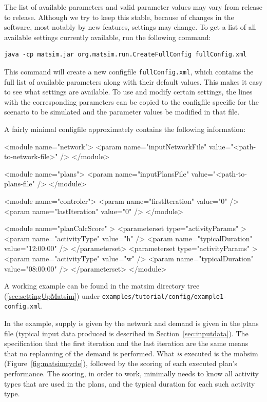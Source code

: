 The list of available parameters and valid parameter values may vary from release to release. Although we try to keep this stable,
because of changes in the software, most notably by new features, settings may change. To get a list of all available settings currently available, run the following command:
\begin{lstlisting}
java -cp matsim.jar org.matsim.run.CreateFullConfig fullConfig.xml
\end{lstlisting}
%
This command will create a new \gls{configfile} \lstinline|fullConfig.xml|, which contains the full list of available parameters along with their default values. This makes it easy to see what settings are available. To use and modify certain settings, the lines with the corresponding parameters can be copied to the \gls{configfile} specific for the \gls{scenario} to be simulated and the parameter values be modified in that file. 

A fairly minimal \gls{configfile} approximately contains the following information:
\begin{xml}
<module name="network">
   <param name="inputNetworkFile" value="<path-to-network-file>" />
</module>

<module name="plans">
   <param name="inputPlansFile" value="<path-to-plans-file" />
</module>

<module name="controler">
   <param name="firstIteration" value="0" />
   <param name="lastIteration" value="0" />
</module>

<module name="planCalcScore" >
   <parameterset type="activityParams" >
      <param name="activityType" value="h" />
      <param name="typicalDuration" value="12:00:00" />
   </parameterset>
   <parameterset type="activityParams" >
      <param name="activityType" value="w" />
      <param name="typicalDuration" value="08:00:00" />
   </parameterset>
</module>
\end{xml}
A working example can be found in the \gls{matsim} directory tree (\cf \ref{sec:settingUpMatsim}) under \lstinline{examples/tutorial/config/example1-config.xml}.
 
In the example, supply is given by 
the network and demand is given in the plans file (typical input data produced is described in Section~\ref{sec:inputdata}). 
%
The specification that the first iteration and the last iteration are the same means that no \gls{replanning} of the demand is performed.  
%
What \emph{is} executed is the \gls{mobsim} (Figure~\ref{fig:matsimcycle}), followed by the scoring of each executed plan's performance.
%
The scoring, in order to work, minimally needs to know all activity types that are used in the plans, and the typical duration for each such activity type.

